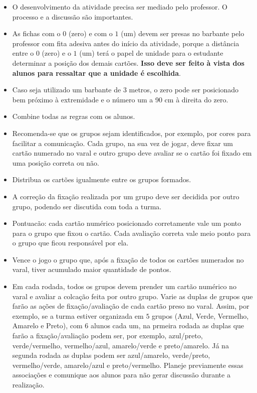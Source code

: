 \begin{multicols}{2}
\begin{itemize}
  \item O desenvolvimento da atividade precisa ser mediado pelo professor. O processo e a discussão são importantes.
  \item As fichas com o $0$ (zero) e com o $1$ (um) devem ser presas no barbante pelo professor com fita adesiva antes do início da atividade, porque a distância entre o $0$ (zero) e o $1$ (um) terá o papel de unidade para o estudante determinar a posição dos demais cartões. {\bf Isso deve ser feito à vista dos alunos para ressaltar que a unidade é escolhida}. 
  \item Caso seja utilizado um barbante de $3$ metros, o zero pode ser posicionado bem próximo à extremidade e o número um a 90 cm à direita do zero.
  \item Combine todas as regras com os alunos.
  \item Recomenda-se que os grupos sejam identificados, por exemplo, por cores para facilitar a comunicação. Cada grupo, na sua vez de jogar, deve fixar um cartão numerado no varal e outro grupo deve avaliar se o cartão foi fixado em uma posição correta ou não.
  \item Distribua os cartões igualmente entre os grupos formados. 
  \item A correção da fixação realizada por um grupo deve ser decidida por outro grupo, podendo ser discutida com toda a turma. 
  \item Pontuacão: cada cartão numérico posicionado corretamente vale um ponto para o grupo que fixou o cartão. Cada avaliação correta vale meio ponto para o grupo que ficou responsável por ela. 
  \item Vence o jogo o grupo que, após a fixação de todos os cartões numerados no varal, tiver acumulado maior quantidade de pontos. 
  \item Em cada rodada, todos os grupos devem prender um cartão numérico no varal e avaliar a colcação feita por outro grupo. Varie as duplas de grupos que farão as ações de fixação/avaliação de cada cartão preso no varal. Assim, por exemplo, se a turma estiver organizada em $5$ grupos (Azul, Verde, Vermelho, Amarelo e Preto), com 6 alunos cada um, na prmeira rodada as duplas que farão a fixação/avaliação podem ser, por exemplo, azul/preto, verde/vermelho, vermelho/azul, amarelo/verde e preto/amarelo. Já na segunda rodada as duplas podem ser azul/amarelo, verde/preto, vermelho/verde, amarelo/azul e preto/vermelho. Planeje previamente essas associações e comunique aos alunos para não gerar discussão durante a realização. 

\end{itemize}
\end{multicols}
